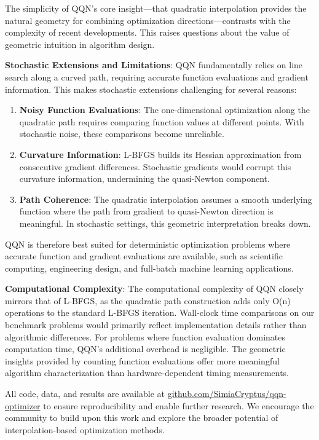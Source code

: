 The simplicity of QQN's core insight---that quadratic interpolation provides the natural geometry for combining
optimization directions---contrasts with the complexity of recent developments. This raises questions about the value of
geometric intuition in algorithm design.

\textbf{Stochastic Extensions and Limitations}: QQN fundamentally relies on line search along a curved path, requiring accurate function evaluations and gradient information. This makes stochastic extensions challenging for several reasons:

\begin{enumerate}
\def\labelenumi{\arabic{enumi}.}
\item
  \textbf{Noisy Function Evaluations}: The one-dimensional optimization along the quadratic path requires comparing function values at different points. With stochastic noise, these comparisons become unreliable.
\item
  \textbf{Curvature Information}: L-BFGS builds its Hessian approximation from consecutive gradient differences. Stochastic gradients would corrupt this curvature information, undermining the quasi-Newton component.
\item
  \textbf{Path Coherence}: The quadratic interpolation assumes a smooth underlying function where the path from gradient to quasi-Newton direction is meaningful. In stochastic settings, this geometric interpretation breaks down.
\end{enumerate}

QQN is therefore best suited for deterministic optimization problems where accurate function and gradient evaluations are available, such as scientific computing, engineering design, and full-batch machine learning applications.

\textbf{Computational Complexity}: The computational complexity of QQN closely mirrors that of L-BFGS, as the quadratic path
construction adds only O(n) operations to the standard L-BFGS iteration. Wall-clock time comparisons on our benchmark
problems would primarily reflect implementation details rather than algorithmic differences. For problems where function
evaluation dominates computation time, QQN's additional overhead is negligible. The geometric insights provided by
counting function evaluations offer more meaningful algorithm characterization than hardware-dependent timing
measurements.

All code, data, and results are available at \href{https://github.com/SimiaCryptus/qqn-optimizer/}{github.com/SimiaCryptus/qqn-optimizer} to
ensure reproducibility and enable further research. We encourage the community to build upon this work and explore the
broader potential of interpolation-based optimization methods.

